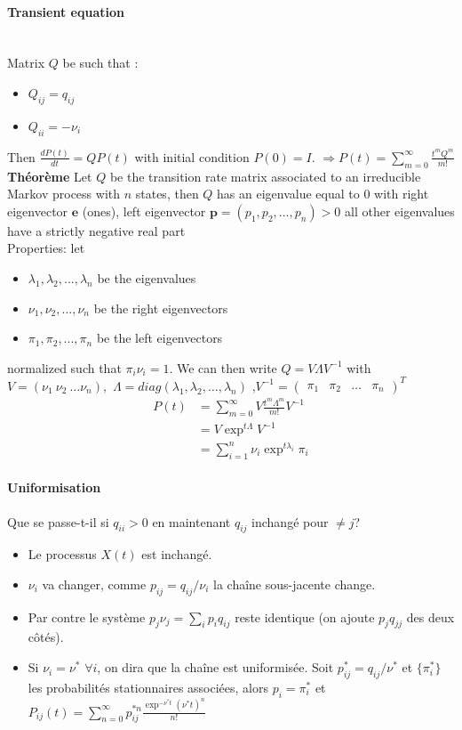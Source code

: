\documentclass[paper=a4,fontsize=8pt,pagesize,DIV=calc]{scrartcl}
\newcounter{row}
\begin{document}
\begin{multicols}{3}
 \paragraph{Transient equation}~~\\
Matrix $Q$ be such that :
\begin{itemize}
\item $Q_{ij} = q_{ij}$
\item $Q_{ii} = -\nu_i$
\end{itemize}
Then $\frac{dP(t)}{dt}=QP(t)$ with initial condition $P(0)=I$.
$\Rightarrow P(t)=\sum_{m=0}^{\infty}\frac{t^mQ^m}{m!}$
\\ \textbf{Théorème} Let $Q$ be the transition rate matrix associated to an irreducible Markov process with $n$ states, then $Q$ has an eigenvalue equal to $0$ with right eigenvector $\bm{e}$ (ones), left eigenvector $\bm{p} = (p_1, p_2, ... , p_n) > 0$ all other eigenvalues have a strictly negative real part
 \\ Properties: let
\begin{itemize}
\item $\lambda_1,\lambda_2, ... ,\lambda_n$ be the eigenvalues
\item $\nu_1, \nu_2, ... , \nu_n$ be the right eigenvectors
\item $\pi_1,\pi_2, ... ,\pi_n$ be the left eigenvectors
\end{itemize}
normalized such that $\pi_i\nu_i = 1$.
We can then write $Q = V \Lambda V^{-1}$ with 
\\ $V = (\nu_1 \ \nu_2 \ \hdots \nu_n) , $ $ \Lambda= diag(\lambda_1,\lambda_2, \hdots ,\lambda_n)$ ,$ V^{-1} =\begin{pmatrix}
\pi_1 & \pi_2 & \hdots  & \pi_n 
\end{pmatrix}^T$
\begin{align*}
P(t) &=\sum_{m=0}^\infty V \frac{t^m\Lambda^m}{m!} V^{-1}\\
&= V \exp^{t\Lambda}V^{ -1}\\
&=\sum_{i=1}^n \nu_i \exp^{t\lambda_i} \pi_i
\end{align*}
\paragraph{Uniformisation}
Que se passe-t-il si $q_{ii} > 0$ en maintenant $q_{ij}$ inchangé pour
$\neq j$?
\begin{itemize}
\item Le processus $X(t)$ est inchangé.
\item $\nu_i$ va changer, comme $p_{ij} = q_{ij}/\nu_i$ la chaîne sous-jacente change.
\item Par contre le système $p_j\nu_j =\sum_i p_i q_{ij}$  reste identique (on ajoute $p_jq_{jj}$ des deux côtés).
\item Si $\nu_i=\nu^*$ $\forall i$, on dira que la chaîne est uniformisée.
Soit $p^*_{ij}=q_{ij}/ \nu^*$ et $\{\pi_i^*\}$ les probabilités stationnaires associées, alors $p_i =\pi_i^*$ et
\\$P_{ij}(t)=\sum_{n=0}^\infty p_{ij}^{*n} \frac{\exp^{-\nu^*t}(\nu^*t)^n}{n!}$
\end{itemize}

\end{multicols}
\end{document}
